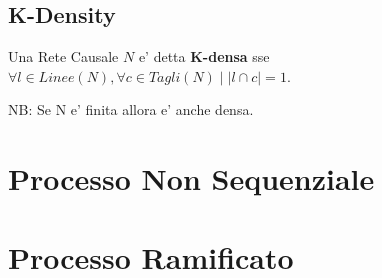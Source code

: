 \subsection{K-Density}

Una Rete Causale $N$ e' detta \textbf{K-densa} sse $\forall l \in Linee(N), \forall c \in Tagli(N) \; | \; |l \cap c| = 1$.

NB: Se N e' finita allora e' anche densa.

\section{Processo Non Sequenziale}

\section{Processo Ramificato}
